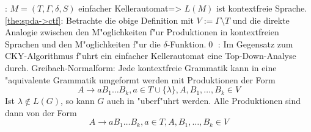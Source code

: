 \theorem:
  $M=(T,\Gamma,\delta,S)$ einfacher Kellerautomat=>{
  \label{the:spda->ctf}
  $L(M)$ ist kontextfreie Sprache.
  }
\proof \ref{the:spda->ctf}:{
  Betrachte die obige Definition mit $V:=\Gamma\setminus T$ und die direkte 
  Analogie zwischen den M"oglichkeiten f"ur Produktionen in kontextfreien 
  Sprachen und den M"oglichkeiten f"ur die $\delta$-Funktion.\qed
  }
\remark:{
  Im Gegensatz zum CKY-Algorithmus f"uhrt ein einfacher Kellerautomat
  eine Top-Down-Analyse durch.
  }
\remark Greibach-Normalform:{
  Jede kontextfreie Grammatik kann in eine
  "aquivalente Grammatik umgeformt werden mit Produktionen der Form
  \[A\to aB_1\dots B_k,a\in T\cup\{\lambda\}, A,B_1,\dots,B_k \in V
    \]
  Ist $\lambda\not\in L(G)$, so kann $G$ auch in 
   "uberf"uhrt werden. Alle Produktionen 
  sind dann von der Form
  \[A\to aB_1\dots B_k,a\in T,A,B_1,\dots,B_k\in V
    \]
  }
